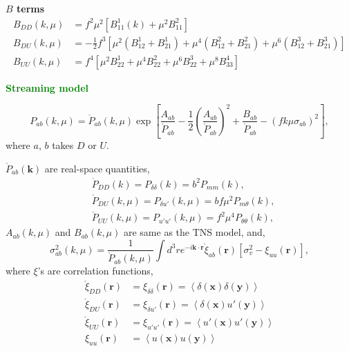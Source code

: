 \documentclass[a4paper,11pt, fleqn]{article}
\begin{document}
\textbf{$B$ terms}\vspace{-2mm}
\begin{align}
  B_{DD}(k, \mu) &= f^2 \mu^2 \left[ B^1_{11}(k) + \mu^2 B^2_{11} \right]\\
  B_{DU}(k, \mu) &= -\frac{1}{2} f^3 \left[
    \mu^2( B^1_{12} + B^1_{21} ) + \mu^4(B^2_{12} + B^2_{21})
    + \mu^6(B^3_{12} + B^3_{21}) \right]\\
  B_{UU}(k, \mu) &= f^4 \left[ \mu^2 B^1_{22} + \mu^4 B^2_{22} + \mu^6
    B^3_{22} + \mu^8 B^4_{33}\right]
\end{align}

%
%
\newpage
{\Huge \textbf{\textcolor{Green}{Streaming model}}}

\vspace{5mm}

\begin{equation}
  P_{ab}(k, \mu) = \mathring{P}_{ab}(k, \mu) \exp \left[
    \frac{A_{ab}}{\mathring{P}_{ab}}
    - \frac{1}{2} \left( \frac{A_{ab}}{\mathring{P}_{ab}} \right)^2
    + \frac{B_{ab}}{\mathring{P}_{ab}} - (f k \mu \sigma_{ab})^2
    \right],
\end{equation}
where $a$, $b$ takes $D$ or $U$.

$\mathring{P}_{ab}(\bm{k})$ are real-space quantities,
\begin{align}
  &\mathring{P}_{DD}(k) = P_{\delta\delta}(k) = b^2 P_{mm}(k),\\
  &\mathring{P}_{DU}(k, \mu) = P_{\delta u'}(k, \mu) = b f\mu^2 P_{m\theta}(k),\\
  &\mathring{P}_{UU}(k, \mu) = P_{u'u'}(k, \mu) = f^2\mu^4 P_{\theta\theta}(k),
\end{align}
$A_{ab}(k, \mu)$ and $B_{ab}(k, \mu)$ are same as the TNS model, and,
%
\begin{equation}
  \sigma_{ab}^2(k, \mu) = \frac{1}{\mathring{P}_{ab}(k, \mu)}
  \int \! d^3 r e^{-i\bm{k}\cdot\bm{r}} 
  \mathring{\xi}_{ab}(\bm{r}) \left[ \sigma^2_v - \xi_{uu}(\bm{r}) \right],
\end{equation}
%
where $\xi$'s are correlation functions,
%
\begin{align}
  \mathring{\xi}_{DD}(\bm{r}) &= \xi_{\delta\delta}(\bm{r}) = \left\langle
  \delta(\bm{x}) \delta(\bm{y}) \right\rangle\\
  \mathring{\xi}_{DU}(\bm{r}) &= \xi_{\delta u'}(\bm{r}) = \left\langle
  \delta(\bm{x}) u'(\bm{y}) \right\rangle\\
  \mathring{\xi}_{UU}(\bm{r}) &= \xi_{u'u'}(\bm{r}) = \left\langle
  u'(\bm{x}) u'(\bm{y}) \right\rangle\\
  \xi_{uu}(\bm{r}) &= \left\langle
  u(\bm{x}) u(\bm{y}) \right\rangle\\
\end{align}
  
\end{document}
